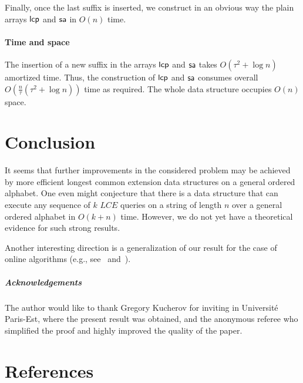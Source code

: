 \documentclass[3p,twocolumn]{elsarticle}
\theoremstyle{plain}
\theoremstyle{definition}
\newcommand{\LCE}{\mathit{LCE}}
\newcommand{\lcp}{{\sf lcp}}
\newcommand{\sa}{{\sf sa}}
\begin{document}
Finally, once the last suffix is inserted, we construct in an obvious way the plain arrays $\lcp$ and $\sa$ in $O(n)$ time.

\paragraph{Time and space} The insertion of a new suffix in the arrays $\lcp$ and $\sa$ takes $O(\tau^2 + \log n)$ amortized time. Thus, the construction of $\lcp$ and $\sa$ consumes overall $O(\frac{n}{\tau}(\tau^2 + \log n))$ time as required. The whole data structure occupies $O(n)$ space.


\section{Conclusion}

It seems that further improvements in the considered problem may be achieved by more efficient longest common extension data structures on a general ordered alphabet. One even might conjecture that there is a data structure that can execute any sequence of $k$ $\LCE$ queries on a string of length $n$ over a general ordered alphabet in $O(k + n)$ time. However, we do not yet have a theoretical evidence for such strong results.

Another interesting direction is a generalization of our result for the case of online algorithms (e.g., see~\cite{HongChen} and~\cite{Kosolobov2}).

\subparagraph*{Acknowledgements}
The author would like to thank Gregory Kucherov for inviting in Universit{\'e} Paris-Est, where the present result was obtained, and the anonymous referee who simplified the proof and highly improved the quality of the paper.

\section*{References}


\end{document}
